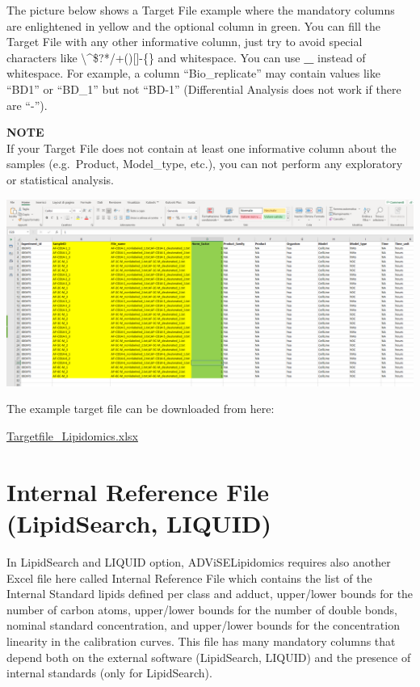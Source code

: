 \documentclass[
]{book}
\begin{document}
The picture below shows a Target File example where the mandatory columns are enlightened in yellow and the optional column in green. You can fill the Target File with any other informative column, just try to avoid special characters like \textbackslash\^{}\$?*/\textbar+(){[}{]}-\{\} and whitespace. You can use \textbf{\_} instead of whitespace. For example, a column ``Bio\_replicate'' may contain values like ``BD1'' or ``BD\_1'' but not ``BD-1'' (Differential Analysis does not work if there are ``-'').

\textbf{NOTE}\\
If your Target File does not contain at least one informative column about the samples (e.g.~Product, Model\_type, etc.), you can not perform any exploratory or statistical analysis.

\includegraphics[width=1\linewidth]{images/target_file_example}

The example target file can be downloaded from here:

\href{https://github.com/ShinyFabio/ADViSELipidomics_book/raw/main/data_example/Targetfile_Lipidomics_example.xlsx}{Targetfile\_Lipidomics.xlsx}

\hypertarget{sec23}{%
\section{Internal Reference File (LipidSearch, LIQUID)}\label{sec23}}

In LipidSearch and LIQUID option, ADViSELipidomics requires also another Excel file here called Internal Reference File which contains the list of the Internal Standard lipids defined per class and adduct, upper/lower bounds for the number of carbon atoms, upper/lower bounds for the number of double bonds, nominal standard concentration, and upper/lower bounds for the concentration linearity in the calibration curves. This file has many mandatory columns that depend both on the external software (LipidSearch, LIQUID) and the presence of internal standards (only for LipidSearch).
\end{document}
